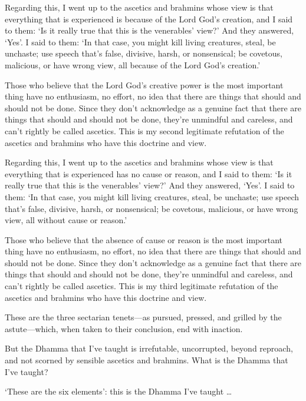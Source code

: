 \documentclass[12pt,openany]{book}%
\begin{document}
Regarding this, I went up to the ascetics and brahmins whose view is that everything that is experienced is because of the Lord God’s creation, and I said to them: ‘Is it really true that this is the venerables’ view?’ And they answered, ‘Yes’. I said to them: ‘In that case, you might kill living creatures, steal, be unchaste; use speech that’s false, divisive, harsh, or nonsensical; be covetous, malicious, or have wrong view, all because of the Lord God’s creation.’ 

Those who believe that the Lord God’s creative power is the most important thing have no enthusiasm, no effort, no idea that there are things that should and should not be done. Since they don’t acknowledge as a genuine fact that there are things that should and should not be done, they’re unmindful and careless, and can’t rightly be called ascetics. This is my second legitimate refutation of the ascetics and brahmins who have this doctrine and view. 

Regarding this, I went up to the ascetics and brahmins whose view is that everything that is experienced has no cause or reason, and I said to them: ‘Is it really true that this is the venerables’ view?’ And they answered, ‘Yes’. I said to them: ‘In that case, you might kill living creatures, steal, be unchaste; use speech that’s false, divisive, harsh, or nonsensical; be covetous, malicious, or have wrong view, all without cause or reason.’ 

Those who believe that the absence of cause or reason is the most important thing have no enthusiasm, no effort, no idea that there are things that should and should not be done. Since they don’t acknowledge as a genuine fact that there are things that should and should not be done, they’re unmindful and careless, and can’t rightly be called ascetics. This is my third legitimate refutation of the ascetics and brahmins who have this doctrine and view. 

These are the three sectarian tenets—as pursued, pressed, and grilled by the astute—which, when taken to their conclusion, end with inaction. 

But the Dhamma that I’ve taught is irrefutable, uncorrupted, beyond reproach, and not scorned by sensible ascetics and brahmins. What is the Dhamma that I’ve taught? 

‘These are the six elements’: this is the Dhamma I’ve taught … 
\end{document}
